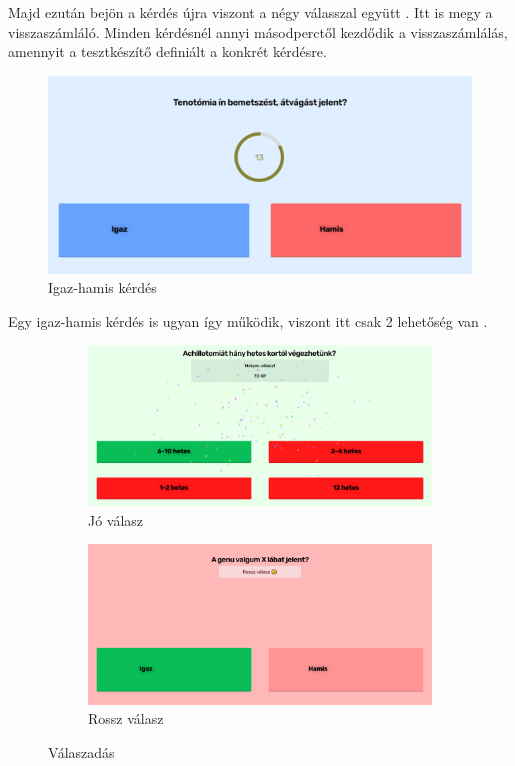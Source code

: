 Majd ezután bejön a kérdés újra viszont a négy válasszal együtt . Itt is megy a visszaszámláló. Minden kérdésnél annyi másodperctől kezdődik a visszaszámlálás, amennyit a tesztkészítő definiált a konkrét kérdésre.

\begin{figure}[H]
    \centering
    \includegraphics[width=\linewidth]{images/question2.png}
    \caption{Igaz-hamis kérdés}
    \label{fig:question2}
\end{figure}

Egy igaz-hamis kérdés is ugyan így működik, viszont itt csak 2 lehetőség van .


\begin{figure}[H]
    \centering
    \begin{subfigure}{0.5\textwidth}
        \centering
        \includegraphics[width=\linewidth]{images/question_good.png}
        \caption{Jó válasz}
    \end{subfigure}%
    \begin{subfigure}{0.5\textwidth}
        \centering
        \includegraphics[width=\linewidth]{images/question_wrong.png}
        \caption{Rossz válasz}
    \end{subfigure}
    \caption{Válaszadás}
    \label{fig:question_good_wrong}
\end{figure}

